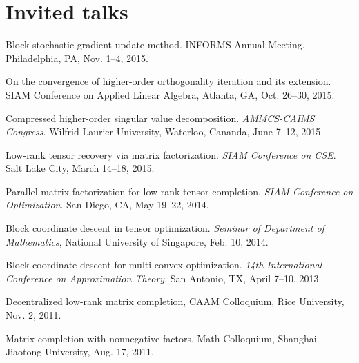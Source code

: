 \documentclass[letterpaper]{article}
\renewenvironment{itemize}{
  \begin{list}{}{
    \setlength{\leftmargin}{1.5em}
  }
}{
  \end{list}
}
\begin{document}
\section*{Invited talks}
\begin{itemize}
\setlength{\itemsep}{-0.5pt}
\item Block stochastic gradient update method. INFORMS Annual Meeting. Philadelphia, PA, Nov. 1--4, 2015.
\item On the convergence of higher-order orthogonality iteration and its extension. SIAM Conference on Applied Linear Algebra, Atlanta, GA, Oct. 26--30, 2015. 
\item Compressed higher-order singular value decomposition. \emph{AMMCS-CAIMS Congress}. Wilfrid Laurier University, Waterloo, Cananda, June 7--12, 2015
\item Low-rank tensor recovery via matrix factorization. \emph{SIAM Conference on CSE}. Salt Lake City, March 14--18, 2015.
\item Parallel matrix factorization for low-rank tensor completion. \emph{SIAM Conference on Optimization}. San Diego, CA, May 19--22, 2014.
\item Block coordinate descent in tensor optimization. \emph{Seminar of Department of Mathematics}, National University of Singapore, Feb. 10, 2014.
\item Block coordinate descent for multi-convex optimization. \emph{14th International Conference on Approximation Theory}. San Antonio, TX, April 7--10, 2013.
\item Decentralized low-rank matrix completion, CAAM Colloquium, Rice University, Nov. 2, 2011.
\item Matrix completion with nonnegative factors, Math Colloquium, Shanghai Jiaotong University, Aug. 17, 2011.
\end{itemize}
\end{document}
